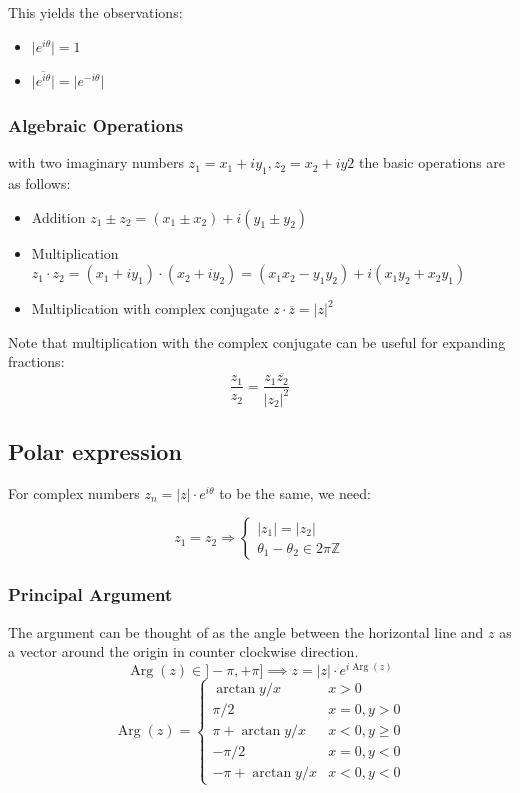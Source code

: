  
This yields the observations:
\begin{itemize}
    \item $\lvert e^{i\theta}\rvert = 1$
    \item $\overline{\lvert e^{i\theta}\rvert} = \rvert e^{-i\theta}\rvert$
\end{itemize}

\subsubsection{Algebraic Operations}
with two imaginary numbers $z_1=x_1+iy_1, z_2=x_2+iy2$ the basic operations are as follows:
\begin{itemize}
    \item {Addition} $z_1\pm z_2 = (x_1\pm x_2) + i(y_1\pm y_2)$
    \item {Multiplication} $z_1\cdot  z_2 = (x_1 + iy_1) \cdot  (x_2+i y_2) = (x_1x_2-y_1y_2)+i(x_1y_2+x_2y_1)$
    \item {Multiplication with complex conjugate} $z\cdot \overline z = \lvert z\rvert ^2$
\end{itemize}
Note that multiplication with the complex conjugate can be useful for expanding fractions: 
$$
\frac{z_1}{z_2}=\frac{z_1\overline{z_2}}{\lvert z_2\rvert ^2}
$$

\subsection{Polar expression}
For complex numbers $z_n=\lvert z\rvert \cdot e^{i\theta}$ to be the same, we need:

\begin{equation*}
z_1=z_2
\Rightarrow 
\begin{cases}
|z_1|=|z_2|\\
\theta_1-\theta_2 \in 2\pi \mathbb Z
\end{cases}
\end{equation*}
\subsubsection{Principal Argument}
The argument can be thought of as the angle between the horizontal line and $z$ as a vector around the origin in counter clockwise direction.
$$
\operatorname{Arg}(z)\in]-\pi,+\pi]\implies z= |z| \cdot e^{i\operatorname{Arg}(z)}
$$
$$
\operatorname{Arg}(z) = \begin{cases}
	\arctan y/x&x > 0\\
	\pi/2&x=0,y>0\\
	\pi + \arctan y/x&x<0,y\ge0\\
	-\pi/2&x=0,y<0\\
	-\pi+ \arctan y/x&x<0,y<0
\end{cases}
$$


